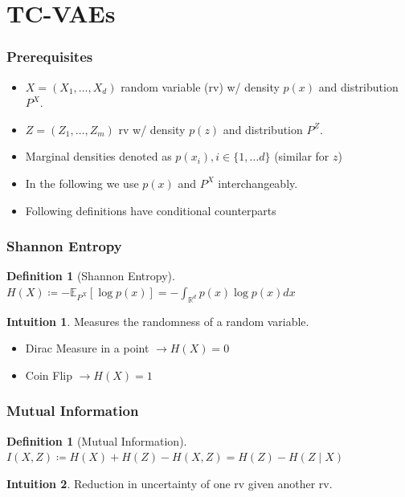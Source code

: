 \documentclass{beamer}
\newcommand{\R}{\mathbb{R}}
\theoremstyle{definition}
\newtheorem{definition}[section]{Definition}
\newtheorem{intuition}{Intuition}
\begin{document}
    \section{TC-VAEs}
    \begin{frame}
      \frametitle{Prerequisites}
      \begin{itemize}
        \item $X = (X_{1}, \dots, X_{d})$ random variable (rv) w/ density $p(x)$ and distribution $P^{X}$.
        \item $Z = (Z_{1}, \dots, Z_{m})$ rv w/ density $p(z)$ and distribution $P^{Z}$.
              \item Marginal densities denoted as $p(x_{i}), i \in \{1, \dots d\}$ (similar for $z$)
        \item In the following we use $p(x)$ and $P^{X}$  interchangeably.
              \item Following definitions have conditional counterparts
      \end{itemize}
    \end{frame}

    \begin{frame}
      \frametitle{Shannon Entropy}
      \begin{definition}[Shannon Entropy]
        $H(X) \coloneqq -\mathbb{E}_{P^{X}}[\log p(x)] = -\int_{\R^{d}}p(x) \log p(x) dx$
      \end{definition}
      \begin{intuition}
       Measures the randomness of a random variable.
     \end{intuition}
     \begin{example}
       \begin{itemize}
         \item Dirac Measure in a point $\rightarrow H(X) = 0$
               \item Coin Flip $\rightarrow H(X) = 1$
       \end{itemize}
     \end{example}
    \end{frame}

    \begin{frame}
      \frametitle{Mutual Information}
      \begin{definition}[Mutual Information]
        $I(X, Z) \coloneqq H(X) + H(Z) - H(X, Z) = H(Z) - H(Z \mid X)$
      \end{definition}
      \begin{intuition}
        Reduction in uncertainty of one rv given another rv.
      \end{intuition}
    \end{frame}
\end{document}
